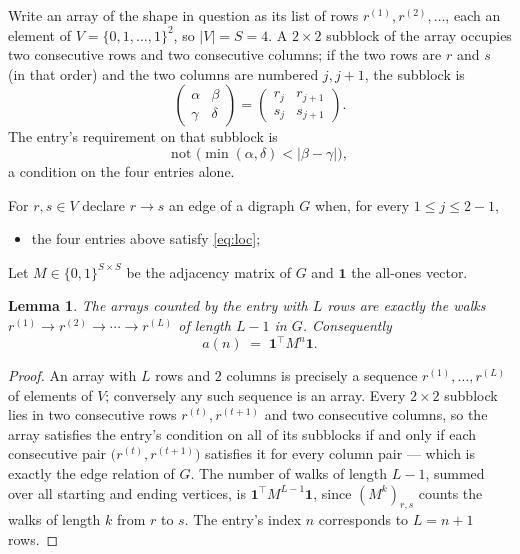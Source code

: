 \documentclass[11pt,a4paper]{article}
\theoremstyle{plain}
\newtheorem{lemma}[theorem]{Lemma}
\theoremstyle{definition}
\begin{document}
Write an array of the shape in question as its list of rows
$r^{(1)},r^{(2)},\dots$, each an element of
$V=\{0,1,\dots,1\}^{2}$, so $|V|=S=4$. A $2\times2$ subblock of the array
occupies two consecutive rows and two consecutive columns; if the two rows are $r$
and $s$ (in that order) and the two columns are numbered $j,j+1$,
the subblock is
\[
\begin{pmatrix}\alpha&\beta\\\gamma&\delta\end{pmatrix}=\begin{pmatrix}r_j&r_{j+1}\\s_j&s_{j+1}\end{pmatrix}.
\]
The entry's requirement on that subblock is
\begin{equation}\label{eq:loc}
\text{not }\bigl(\min(\alpha,\delta)<|\beta-\gamma|\bigr),
\end{equation}
a condition on the four entries alone.

For $r,s\in V$ declare $r\to s$ an edge of a digraph $G$ when, for every
$1\le j\le 2-1$,
\begin{itemize}
\item the four entries above satisfy \eqref{eq:loc};

\end{itemize}
Let $M\in\{0,1\}^{S\times S}$ be the adjacency matrix of $G$ and $\mathbf{1}$ the
all-ones vector.

\begin{lemma}\label{lem:walk}
The arrays counted by the entry with $L$ rows are exactly the walks
$r^{(1)}\to r^{(2)}\to\cdots\to r^{(L)}$ of length $L-1$ in $G$. Consequently
\[
a(n)\;=\;\mathbf{1}^{\!\top}M^{n}\mathbf{1} .
\]
\end{lemma}

\begin{proof}
An array with $L$ rows and $2$ columns is precisely a sequence
$r^{(1)},\dots,r^{(L)}$ of elements of $V$; conversely any such sequence is an array.
Every $2\times2$ subblock lies in two consecutive rows $r^{(t)},r^{(t+1)}$ and two
consecutive columns, so the array satisfies the entry's condition on all of its subblocks
if and only if each consecutive pair $\bigl(r^{(t)},r^{(t+1)}\bigr)$ satisfies it for
every column pair --- which is exactly the edge relation of $G$. The number of walks of
length $L-1$, summed over all starting and ending vertices, is
$\mathbf{1}^{\!\top}M^{L-1}\mathbf{1}$, since $(M^{k})_{r,s}$ counts the walks of
length $k$ from $r$ to $s$. The entry's index $n$ corresponds to $L=n+1$ rows.
\end{proof}
\end{document}
